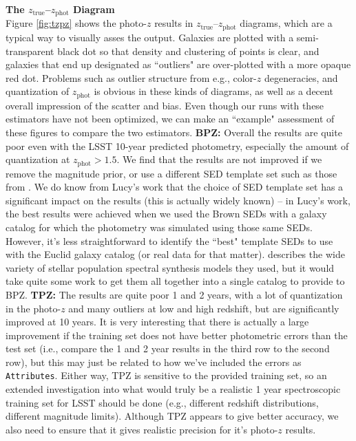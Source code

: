 \documentclass[DM,lsstdraft,toc]{lsstdoc}
\begin{document}
\smallskip \noindent \textbf{The $z_\mathrm{true}$--$z_\mathrm{phot}$ Diagram} \\
Figure \ref{fig:tzpz} shows the photo-$z$ results in $z_\mathrm{true}$--$z_\mathrm{phot}$ diagrams, which are a typical way to visually asses the output. Galaxies are plotted with a semi-transparent black dot so that density and clustering of points is clear, and galaxies that end up designated as ``outliers" are over-plotted with a more opaque red dot. Problems such as outlier structure from e.g., color-$z$ degeneracies, and quantization of $z_\mathrm{phot}$ is obvious in these kinds of diagrams, as well as a decent overall impression of the scatter and bias. Even though our runs with these estimators have not been optimized, we can make an ``example" assessment of these figures to compare the two estimators.
\textbf{BPZ:} Overall the results are quite poor even with the LSST 10-year predicted photometry, especially the amount of quantization at $z_\mathrm{phot}>1.5$. We find that the results are not improved if we remove the magnitude prior, or use a different SED template set such as those from \cite{2014ApJS..212...18B}. We do know from Lucy's work that the choice of SED template set has a significant impact on the results (this is actually widely known) -- in Lucy's work, the best results were achieved when we used the Brown SEDs with a galaxy catalog for which the photometry was simulated using those same SEDs. However, it's less straightforward to identify the ``best" template SEDs to use with the Euclid galaxy catalog (or real data for that matter). \cite{2014MNRAS.439..264G} describes the wide variety of stellar population spectral synthesis models they used, but it would take quite some work to get them all together into a single catalog to provide to BPZ.
\textbf{TPZ:} The results are quite poor 1 and 2 years, with a lot of quantization in the photo-$z$ and many outliers at low and high redshift, but are significantly improved at 10 years. It is very interesting that there is actually a large improvement if the training set does not have better photometric errors than the test set (i.e., compare the 1 and 2 year results in the third row to the second row), but this may just be related to how we've included the errors as \texttt{Attributes}. Either way, TPZ is sensitive to the provided training set, so an extended investigation into what would truly be a realistic 1 year spectroscopic training set for LSST should be done (e.g., different redshift distributions, different magnitude limits). Although TPZ appears to give better accuracy, we also need to ensure that it gives realistic precision for it's photo-$z$ results.
\end{document}
